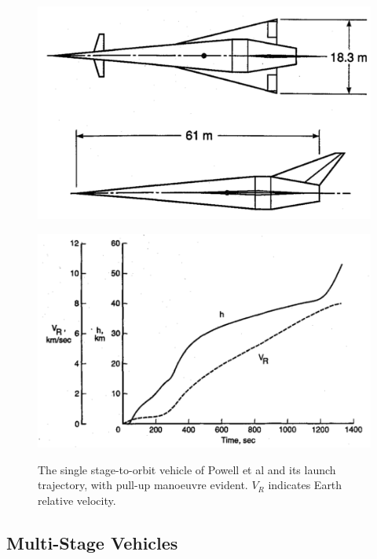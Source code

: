 \begin{figure}[h]
	\centering
	\begin{minipage}[b]{0.3\textwidth}
		\centering
		\includegraphics[width=\linewidth]{"figures/2_literature-review/Powell Vehicle"}
		
		\label{fig:PowellVehicle}
	\end{minipage}	
	\begin{minipage}[b]{0.6\textwidth}
		\includegraphics[width=\linewidth]{"figures/2_literature-review/Powell Trajectory"}
	
		\label{fig:PowellTrajectory}
	\end{minipage}
	\caption{The single stage-to-orbit vehicle of Powell et al\cite{Powell1991} and its launch trajectory, with pull-up manoeuvre evident. $V_R$ indicates Earth relative velocity. }
	\label{fig:Powell}
\end{figure}
 
 \subsection{Multi-Stage Vehicles}

